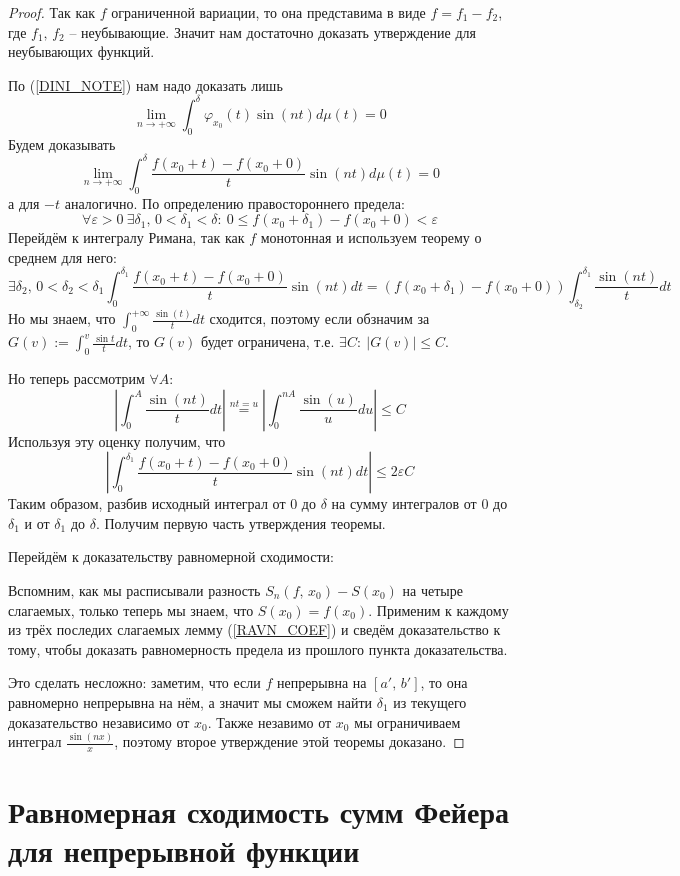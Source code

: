 \documentclass[a4paper,12pt]{article}
\renewcommand{\phi}{\ensuremath{\varphi}}
\renewcommand{\leq}{\ensuremath{\leqslant}}
\theoremstyle{plain}
\theoremstyle{definition}
\theoremstyle{remark}
\begin{document}
\begin{proof}
	Так как $f$ ограниченной вариации, то она представима в виде $f = f_1 - f_2$, где $f_1,\,f_2$ -- неубывающие. Значит нам достаточно доказать утверждение для неубывающих функций.

	По (\ref{DINI_NOTE}) нам надо доказать лишь
	\[\lim_{n \to +\infty} \int_0^\delta \phi_{x_0}(t)\sin(nt)d\mu(t) = 0\]
	Будем доказывать
	\[\lim_{n \to +\infty} \int_0^\delta\frac{f(x_0 + t) - f(x_0 + 0)}{t}\sin(nt)d\mu(t) = 0\]
	а для $-t$ аналогично. По определению правостороннего предела:
	\[\forall \varepsilon > 0 \: \exists \delta_1,\, 0 < \delta_1 < \delta :\: 0 \leq f(x_0 + \delta_1) - f(x_0 + 0) < \varepsilon\]
	Перейдём к интегралу Римана, так как $f$ монотонная и используем теорему о среднем для него:
	\[\exists \delta_2,\, 0<\delta_2<\delta_1 \int_0^{\delta_1} \frac{f(x_0 + t) - f(x_0 + 0)}{t}\sin(nt)dt = (f(x_0 + \delta_1) - f(x_0 + 0))\int_{\delta_2}^{\delta_1}\frac{\sin(nt)}{t}dt\]
	Но мы знаем, что $\int_0^{+\infty} \frac{\sin(t)}{t}dt$ сходится, поэтому если обзначим за $G(v) := \int_0^v \frac{\sin t}{t}dt$, то $G(v)$ будет ограничена, т.е. $\exists C:\: |G(v)| \leq C$.

	Но теперь рассмотрим $\forall A$:
	\[\left| \int_0^A \frac{\sin(nt)}{t}dt\right| \stackrel{nt = u}{=} \left|\int_0^{nA} \frac{\sin(u)}{u}du\right| \leq C\]
	Используя эту оценку получим, что
	\[\left|\int_0^{\delta_1} \frac{f(x_0 + t) - f(x_0 + 0)}{t}\sin(nt)dt\right| \leq 2\varepsilon C\]
	Таким образом, разбив исходный интеграл от $0$ до $\delta$ на сумму интегралов от $0$ до $\delta_1$ и от $\delta_1$ до $\delta$. Получим первую часть утверждения теоремы.

	Перейдём к доказательству равномерной сходимости:

	Вспомним, как мы расписывали разность $S_n(f,\,x_0) - S(x_0)$ на четыре слагаемых, только теперь мы знаем, что $S(x_0) = f(x_0)$. Применим к каждому из трёх последих слагаемых лемму (\ref{RAVN_COEF}) и сведём доказательство к тому, чтобы доказать равномерность предела из прошлого пункта доказательства.

	Это сделать несложно: заметим, что если $f$ непрерывна на $[a',\,b']$, то она равномерно непрерывна на нём, а значит мы сможем найти $\delta_1$ из текущего доказательство независимо от $x_0$. Также незавимо от $x_0$ мы ограничиваем интеграл $\frac{\sin(nx)}{x}$, поэтому второе утверждение этой теоремы доказано.
\end{proof}

\section{Равномерная сходимость сумм Фейера для непрерывной функции}
\end{document}

